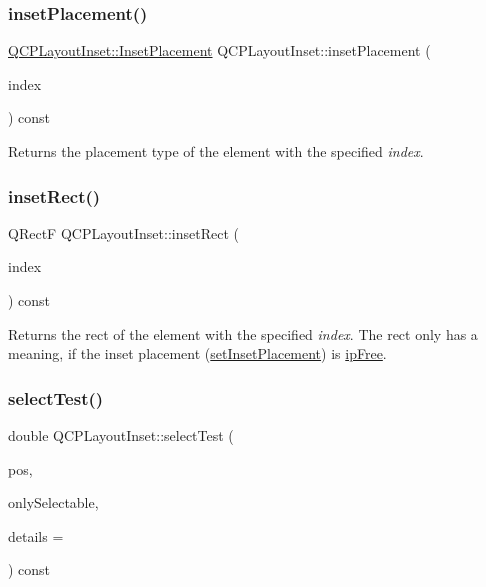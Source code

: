 \subsubsection{\texorpdfstring{inset\+Placement()}{insetPlacement()}}
{\footnotesize\ttfamily \hyperlink{class_q_c_p_layout_inset_a8b9e17d9a2768293d2a7d72f5e298192}{Q\+C\+P\+Layout\+Inset\+::\+Inset\+Placement} Q\+C\+P\+Layout\+Inset\+::inset\+Placement (\begin{DoxyParamCaption}\item[{int}]{index }\end{DoxyParamCaption}) const}

Returns the placement type of the element with the specified {\itshape index}. \mbox{\label{class_q_c_p_layout_inset_ab23099a46af17c31f4c40668f13c9de1}} 
\subsubsection{\texorpdfstring{inset\+Rect()}{insetRect()}}
{\footnotesize\ttfamily Q\+RectF Q\+C\+P\+Layout\+Inset\+::inset\+Rect (\begin{DoxyParamCaption}\item[{int}]{index }\end{DoxyParamCaption}) const}

Returns the rect of the element with the specified {\itshape index}. The rect only has a meaning, if the inset placement (\hyperlink{class_q_c_p_layout_inset_a63298830744d5d8c5345511c00fd2144}{set\+Inset\+Placement}) is \hyperlink{class_q_c_p_layout_inset_a8b9e17d9a2768293d2a7d72f5e298192aa4802986ea2cea457f932b115acba59e}{ip\+Free}. \mbox{\label{class_q_c_p_layout_inset_a2eeef7ea1b8340e7c7c2e2fc229df5ea}} 
\subsubsection{\texorpdfstring{select\+Test()}{selectTest()}}
{\footnotesize\ttfamily double Q\+C\+P\+Layout\+Inset\+::select\+Test (\begin{DoxyParamCaption}\item[{const Q\+PointF \&}]{pos,  }\item[{bool}]{only\+Selectable,  }\item[{Q\+Variant $\ast$}]{details = {} }\end{DoxyParamCaption}) const\hspace{0.3cm}{\ttfamily [virtual]}}

